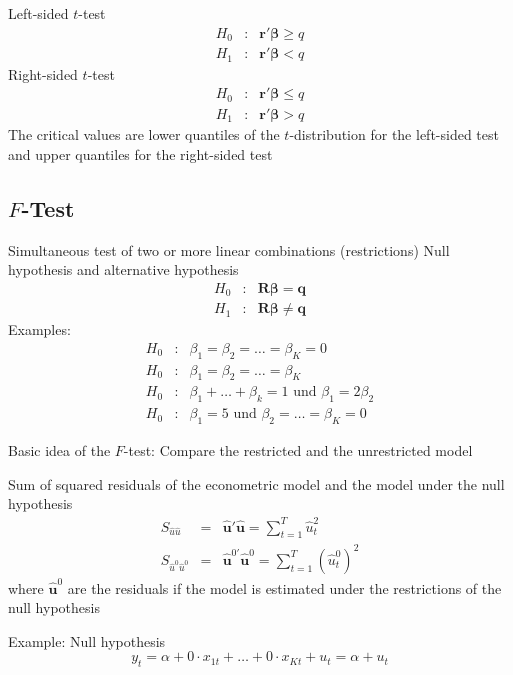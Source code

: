 \documentclass{article}
\begin{document}
Left-sided $t$-test
\begin{eqnarray*}
H_{0} &:&\mathbf{\mathbf{r}'\beta }\geq q \\
H_{1} &:&\mathbf{\mathbf{r}'\beta }<q
\end{eqnarray*}
Right-sided $t$-test
\begin{eqnarray*}
H_{0} &:&\mathbf{\mathbf{r}'\beta }\leq q \\
H_{1} &:&\mathbf{\mathbf{r}'\beta }>q
\end{eqnarray*}
The critical values are lower quantiles of the $t$-distribution for
the left-sided test and upper quantiles for the right-sided test

\subsection*{$F$-Test}

Simultaneous test of two or more linear combinations (restrictions) 
Null hypothesis and alternative hypothesis
\begin{eqnarray*}
H_{0} &:&\mathbf{R\beta }=\mathbf{q} \\
H_{1} &:&\mathbf{R\beta }\neq \mathbf{q}
\end{eqnarray*}
Examples:
\begin{eqnarray*}
H_{0} &:&\beta _{1}=\beta _{2}=\ldots =\beta _{K}=0 \\
H_{0} &:&\beta _{1}=\beta _{2}=\ldots =\beta _{K} \\
H_{0} &:&\beta _{1}+\ldots +\beta _{k}=1\text{ und }\beta _{1}=2\beta _{2} \\
H_{0} &:&\beta _{1}=5\text{ und }\beta _{2}=\ldots =\beta _{K}=0
\end{eqnarray*}

Basic idea of the $F$-test: Compare the restricted and the
unrestricted model

Sum of squared residuals of the econometric model and the model under
the null hypothesis
\begin{eqnarray*}
S_{\hat{u}\hat{u}} &=&\mathbf{\hat{u}}'\mathbf{\hat{u}}%
=\sum_{t=1}^{T}\hat{u}_{t}^{2} \\
S_{\hat{u}^{0}\hat{u}^{0}} &=&\mathbf{\hat{u}}^{0\prime }\mathbf{\hat{u}}%
^{0}=\sum_{t=1}^{T}\left( \hat{u}_{t}^{0}\right) ^{2}
\end{eqnarray*}%
where $\mathbf{\hat{u}}^{0}$ are the residuals if the model is estimated
under the restrictions of the null hypothesis

Example: Null hypothesis
\begin{equation*}
y_{t}=\alpha +0\cdot x_{1t}+\ldots +0\cdot x_{Kt}+u_{t}=\alpha +u_{t}
\end{equation*}
\end{document}
